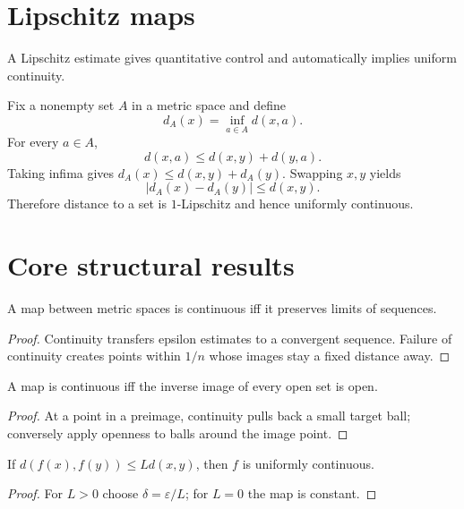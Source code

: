 \section{Lipschitz maps}
A Lipschitz estimate gives quantitative control and automatically implies uniform continuity.


\begin{example}\label{ex:ii05-expand-03}
Fix a nonempty set \(A\) in a metric space and define
\[
d_A(x)=\inf_{a\in A}d(x,a).
\]
For every \(a\in A\),
\[
d(x,a)\le d(x,y)+d(y,a).
\]
Taking infima gives \(d_A(x)\le d(x,y)+d_A(y)\). Swapping \(x,y\) yields
\[
|d_A(x)-d_A(y)|\le d(x,y).
\]
Therefore distance to a set is \(1\)-Lipschitz and hence uniformly continuous.
\end{example}
\section{Core structural results}

\begin{theorem}\label{thm:ii05-01}
A map between metric spaces is continuous iff it preserves limits of sequences.
\begin{proof}
Continuity transfers epsilon estimates to a convergent sequence. Failure of continuity creates points within $1/n$ whose images stay a fixed distance away.
\end{proof}
\end{theorem}

\begin{theorem}\label{thm:ii05-02}
A map is continuous iff the inverse image of every open set is open.
\begin{proof}
At a point in a preimage, continuity pulls back a small target ball; conversely apply openness to balls around the image point.
\end{proof}
\end{theorem}

\begin{theorem}\label{thm:ii05-03}
If $d(f(x),f(y))\le Ld(x,y)$, then $f$ is uniformly continuous.
\begin{proof}
For $L>0$ choose $\delta=\varepsilon/L$; for $L=0$ the map is constant.
\end{proof}
\end{theorem}

